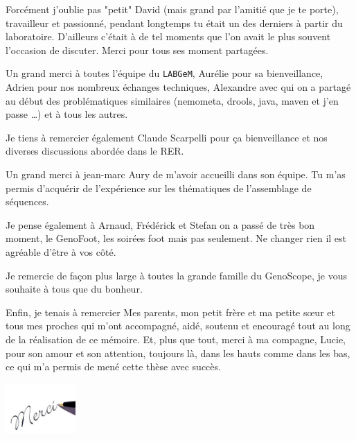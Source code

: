     Forcément j'oublie pas "petit" David (mais grand par l'amitié que je te porte), travailleur et passionné, pendant longtemps tu était un des derniers à partir du laboratoire. D'ailleurs c'était à de tel moments que l'on avait le plus souvent l'occasion de discuter. Merci pour tous ses moment partagées.
    
    Un grand merci à toutes l'équipe du \texttt{LABGeM}, Aurélie pour sa bienveillance, Adrien pour nos nombreux échanges techniques, Alexandre avec qui on a partagé au début des problématiques similaires (nemometa, drools, java, maven et j'en passe \ldots) et à tous les autres.
    
    Je tiens à remercier également Claude Scarpelli pour ça bienveillance et nos diverses discussions abordée dans le RER.
    
    Un grand merci à jean-marc Aury de m'avoir accueilli dans son équipe. Tu m'as permis d'acquérir de l'expérience sur les thématiques de l'assemblage de séquences.
    
    Je pense également à Arnaud, Frédérick et Stefan on a passé de très bon moment, le GenoFoot, les soirées foot mais pas seulement. Ne changer rien il est agréable d'être à vos côté.
    
    Je remercie de façon plus large à toutes la grande famille du GenoScope, je vous souhaite à tous que du bonheur.
    
    Enfin, je tenais à remercier Mes parents, mon petit frère et ma petite sœur et tous mes proches qui m'ont accompagné, aidé, soutenu et encouragé tout au long de la réalisation de ce mémoire. Et, plus que tout, merci à ma compagne, Lucie, pour son amour et son attention, toujours là, dans les hauts comme dans les bas, ce qui m'a permis de mené cette thèse avec succès.

\vspace{2cm}
\raggedleft \includegraphics[height=2cm]{img/merci.jpg}
\normalFont